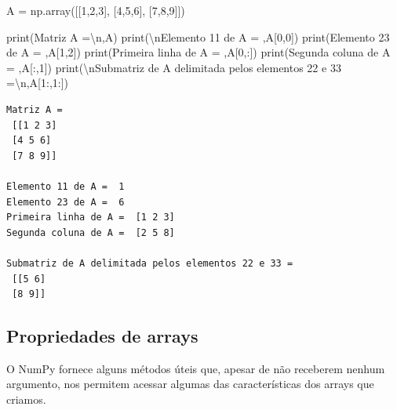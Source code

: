 \documentclass[
  brazilian,
  letterpaper,
  DIV=11,
  numbers=noendperiod]{scrreprt}
\newenvironment{Shaded}{\begin{snugshade}}{\end{snugshade}}
\newcommand{\BuiltInTok}[1]{\textcolor[rgb]{0.00,0.23,0.31}{#1}}
\newcommand{\CharTok}[1]{\textcolor[rgb]{0.13,0.47,0.30}{#1}}
\newcommand{\DecValTok}[1]{\textcolor[rgb]{0.68,0.00,0.00}{#1}}
\newcommand{\NormalTok}[1]{\textcolor[rgb]{0.00,0.23,0.31}{#1}}
\newcommand{\OperatorTok}[1]{\textcolor[rgb]{0.37,0.37,0.37}{#1}}
\newcommand{\StringTok}[1]{\textcolor[rgb]{0.13,0.47,0.30}{#1}}
\begin{document}
\begin{Shaded}
\begin{Highlighting}[]
\NormalTok{A }\OperatorTok{=}\NormalTok{ np.array([[}\DecValTok{1}\NormalTok{,}\DecValTok{2}\NormalTok{,}\DecValTok{3}\NormalTok{], [}\DecValTok{4}\NormalTok{,}\DecValTok{5}\NormalTok{,}\DecValTok{6}\NormalTok{], [}\DecValTok{7}\NormalTok{,}\DecValTok{8}\NormalTok{,}\DecValTok{9}\NormalTok{]])}

\BuiltInTok{print}\NormalTok{(}\StringTok{\textquotesingle{}Matriz A =}\CharTok{\textbackslash{}n}\StringTok{\textquotesingle{}}\NormalTok{,A)}
\BuiltInTok{print}\NormalTok{(}\StringTok{\textquotesingle{}}\CharTok{\textbackslash{}n}\StringTok{Elemento 11 de A = \textquotesingle{}}\NormalTok{,A[}\DecValTok{0}\NormalTok{,}\DecValTok{0}\NormalTok{])}
\BuiltInTok{print}\NormalTok{(}\StringTok{\textquotesingle{}Elemento 23 de A = \textquotesingle{}}\NormalTok{,A[}\DecValTok{1}\NormalTok{,}\DecValTok{2}\NormalTok{])}
\BuiltInTok{print}\NormalTok{(}\StringTok{\textquotesingle{}Primeira linha de A = \textquotesingle{}}\NormalTok{,A[}\DecValTok{0}\NormalTok{,:])}
\BuiltInTok{print}\NormalTok{(}\StringTok{\textquotesingle{}Segunda coluna de A = \textquotesingle{}}\NormalTok{,A[:,}\DecValTok{1}\NormalTok{])}
\BuiltInTok{print}\NormalTok{(}\StringTok{\textquotesingle{}}\CharTok{\textbackslash{}n}\StringTok{Submatriz de A delimitada pelos elementos 22 e 33 =}\CharTok{\textbackslash{}n}\StringTok{\textquotesingle{}}\NormalTok{,A[}\DecValTok{1}\NormalTok{:,}\DecValTok{1}\NormalTok{:])}
\end{Highlighting}
\end{Shaded}

\begin{verbatim}
Matriz A =
 [[1 2 3]
 [4 5 6]
 [7 8 9]]

Elemento 11 de A =  1
Elemento 23 de A =  6
Primeira linha de A =  [1 2 3]
Segunda coluna de A =  [2 5 8]

Submatriz de A delimitada pelos elementos 22 e 33 =
 [[5 6]
 [8 9]]
\end{verbatim}

\subsection{Propriedades de arrays}\label{propriedades-de-arrays}

O NumPy fornece alguns métodos úteis que, apesar de não receberem nenhum
argumento, nos permitem acessar algumas das características dos arrays
que criamos.
\end{document}
